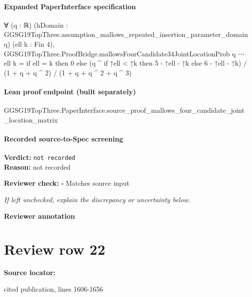 \documentclass[10pt]{article}
\newcommand{\reviewerbox}{%
  \par\noindent\fbox{\parbox{0.96\linewidth}{\rule{0pt}{0.38in}}}\par
}
\newcommand{\reviewmatch}[1]{%
  \par\noindent\textbf{Reviewer check:} $\square$\; #1\par
  \noindent\emph{If left unchecked, explain the discrepancy or uncertainty below.}\par
}
\begin{document}
\paragraph{Expanded PaperInterface specification}
\begin{ReviewVerbatim}
∀ (q : ℝ) (hDomain : GGSG19TopThree.assumption_mallows_repeated_insertion_parameter_domain q) (ell k : Fin 4),
  GGSG19TopThree.ProofBridge.mallowsFourCandidate34JointLocationProb q ⋯ ell k =
    if ell = k then 0
    else (q ^ if ↑ell < ↑k then 5 - ↑ell - ↑k else 6 - ↑ell - ↑k) / (1 + q + q ^ 2) / (1 + q + q ^ 2 + q ^ 3)
\end{ReviewVerbatim}

\paragraph{Lean proof endpoint (built separately)}\begin{ReviewVerbatim}
GGSG19TopThree.PaperInterface.source_proof_mallows_four_candidate_joint_location_matrix
\end{ReviewVerbatim}

\paragraph{Recorded source-to-Spec screening}
\textbf{Verdict:} \texttt{not recorded}
\\
\textbf{Reason:} not recorded
\reviewmatch{Matches source input}
\noindent\textbf{Reviewer annotation}\par
\reviewerbox
\clearpage
\hypertarget{source-claim-ddc5814263488e0b}{}
\section*{Review row 22}
\textbf{Source locator:} {\footnotesize\raggedright cited publication, lines 1606-\allowbreak{}1656\par}
\end{document}
